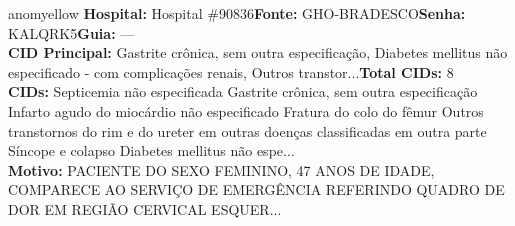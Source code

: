 \documentclass[a4paper,10pt]{article}
\begin{document}
\begin{anomalycard}[Interna\c{c}\~{a}o \#120367 | Pac. \#99781 | MODERADO (z=2.48) | LOS: 17d | 06/03/2026\,$\to$\,—]{anomyellow}
\textbf{Hospital:} Hospital \#90836\quad \textbf{Fonte:} GHO-BRADESCO\quad \textbf{Senha:} KALQRK5\quad \textbf{Guia:} ---\\

\textbf{CID Principal:} {\small Gastrite crônica, sem outra especificação, Diabetes mellitus não especificado - com complicações renais, Outros transtor...}\quad\textbf{Total CIDs:} 8\\

\textbf{CIDs:} {\scriptsize Septicemia não especificada \textbar{} Gastrite crônica, sem outra especificação \textbar{} Infarto agudo do miocárdio não especificado \textbar{} Fratura do colo do fêmur \textbar{} Outros transtornos do rim e do ureter em outras doenças classificadas em outra parte \textbar{} Síncope e colapso \textbar{} Diabetes mellitus não espe...}\\

\textbf{Motivo:} {\scriptsize PACIENTE DO SEXO FEMININO, 47 ANOS DE IDADE, COMPARECE AO SERVIÇO DE EMERGÊNCIA REFERINDO QUADRO DE DOR EM REGIÃO CERVICAL ESQUER...}\\



\end{anomalycard}
\end{document}

